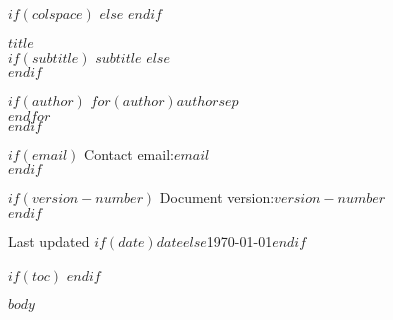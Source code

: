 \documentclass[
$if(fontsize)$
  $fontsize$,
$endif$
$if(papersize)$
  $papersize$paper,
$endif$
$for(classoption)$
  $classoption$$sep$,
$endfor$
]{$documentclass$}
\begin{document}
\pagestyle{otherpages}
\thispagestyle{firstpage}
\afterpage{\aftergroup\restoregeometry}

$if(colspace)$
  \setlength{\tabcolsep}{$colspace$}
$else$
  \setlength{\tabcolsep}{12pt}
$endif$

{\Large\bf $title$}\\[4pt]
$if(subtitle)$
  {\normalsize $subtitle$}
$else$
  \phantom{text}\\[-32pt]
$endif$

{\normalsize{%
$if(author)$
  $for(author)$$author$$sep$\\ $endfor$\\[-20pt]
$endif$}}

{\normalsize{%
$if(email)$
  Contact email:\;$email$\\[-20pt]
$endif$}}

{\normalsize{%
$if(version-number)$
  Document version:\;\texttt{$version-number$}\\[-20pt]
$endif$}}

Last updated $if(date)$$date$$else$\today$endif$
\vspace{1mm}


$if(toc)$
  \setcounter{page}{1}
  \setcounter{tocdepth}{2}
  \tableofcontents
$endif$

$body$
\end{document}
